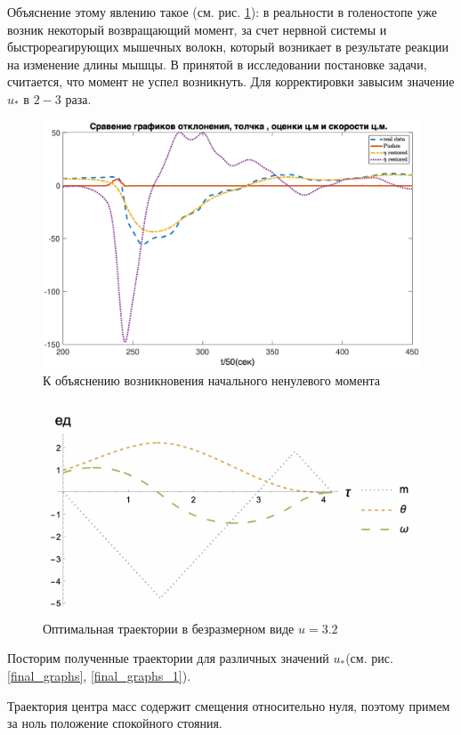 \documentclass[a4paper,12pt, openany]{book}
\theoremstyle{plain} %
\theoremstyle{definition} %
\theoremstyle{remark} %
\numberwithin{equation}{chapter}
\begin{document}
{Объяснение этому явлению такое (см. рис. \ref{all_bold}): в реальности в голеностопе уже возник некоторый возвращающий момент, за счет нервной системы и быстрореагирующих мышечных волокн,
 который возникает в результате реакции на изменение длины мышцы.
В принятой в исследовании постановке задачи, считается, что момент не успел возникнуть. Для корректировки завысим значение $u_\ast$ в $2-3$ раза.
\begin{figure}[h!]
    \centering
    \includegraphics[width=0.9\linewidth]{cp3_bold.eps}
    \caption{К объяснению возникновения начального ненулевого момента}
    \label{all_bold}
\end{figure}
\begin{figure}[h!]
    \centering
    \includegraphics[width=0.9\linewidth]{3_graphs.png}
    \caption{Оптимальная траектории в безразмерном виде $u=3.2$ }
    \label{3_graphs}
\end{figure}

Посторим полученные траектории для различных значений $u_\ast$(см. рис. \ref{final_graphs}, \ref{final_graphs_1}).

Траектория центра масс содержит смещения относительно нуля, поэтому примем за ноль положение спокойного стояния.

}
\end{document}

